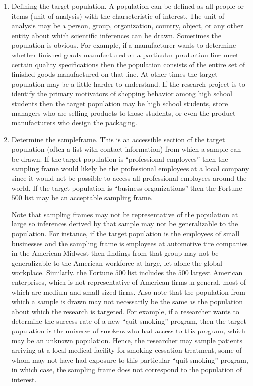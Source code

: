 \begin{enumerate}
	\item Defining the target population. A population can be defined as all people or items (unit of analysis) with the characteristic of interest. The unit of analysis may be a person, group, organization, country, object, or any other entity about which scientific inferences can be drawn. Sometimes the population is obvious. For example, if a manufacturer wants to determine whether finished goods manufactured on a particular production line meet certain quality specifications then the population consists of the entire set of finished goods manufactured on that line. At other times the target population may be a little harder to understand. If the research project is to identify the primary motivators of shopping behavior among high school students then the target population may be high school students, store managers who are selling products to those students, or even the product manufacturers who design the packaging. 

	\item Determine the \gls{sampleframe}. This is an accessible section of the target population (often a list with contact information) from which a sample can be drawn. If the target population is ``professional employees'' then the sampling frame would likely be the professional employees at a local company since it would not be possible to access all professional employees around the world. If the target population is ``business organizations'' then the Fortune $ 500 $ list may be an acceptable sampling frame.

	Note that sampling frames may not be representative of the population at large so inferences derived by that sample may not be generalizable to the population. For instance, if the target population is the employees of small businesses and the sampling frame is employees at automotive tire companies in the American Midwest then findings from that group may not be generalizable to the American workforce at large, let alone the global workplace. Similarly, the Fortune $ 500 $ list includes the $ 500 $ largest American enterprises, which is not representative of American firms in general, most of which are medium and small-sized firms. Also note that the population from which a sample is drawn may not necessarily be the same as the population about which the research is targeted. For example, if a researcher wants to determine the success rate of a new ``quit smoking'' program, then the target population is the universe of smokers who had access to this program, which may be an unknown population. Hence, the researcher may sample patients arriving at a local medical facility for smoking cessation treatment, some of whom may not have had exposure to this particular ``quit smoking'' program, in which case, the sampling frame does not correspond to the population of interest.


\end{enumerate}
